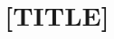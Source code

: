 \documentclass{includes/sig-alternate}
\begin{document}
%

\title{[TITLE]}
%
%
%
%
%

%
\begin{comment} %
\author{
%
%
\alignauthor
Nick Blundell\\
       \affaddr{School of Computer Science}\\
       \affaddr{University of Birmingham}\\
       \affaddr{United Kingdom}\\
       \email{n.blundell@cs.bham.ac.uk}
\alignauthor
Rachid Anane\\
       \affaddr{Coventry University}\\
       \affaddr{Coventry}\\
       \affaddr{United Kingdom}\\
       \email{R.Anane@coventry.ac.uk}
}
\end{comment}
\end{document}
